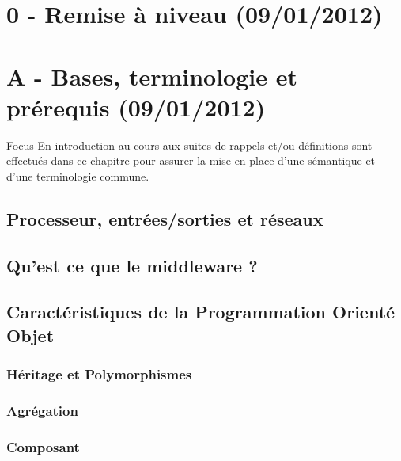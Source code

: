 \section{0 - Remise à niveau (09/01/2012)}

\section{A - Bases, terminologie et prérequis (09/01/2012)}
\begin{frame}
  \begin{block}{Focus}
    En introduction au cours aux suites de rappels et/ou définitions
    sont effectués dans ce chapitre pour assurer la mise en place d'une
    sémantique et d'une terminologie commune.    
  \end{block}
\end{frame}
\subsection{Processeur, entrées/sorties et réseaux}

\subsection{Qu'est ce que le middleware ?}

\subsection{Caractéristiques de la Programmation Orienté Objet}
\subsubsection{Héritage et Polymorphismes}
\subsubsection{Agrégation}
\subsubsection{Composant}

